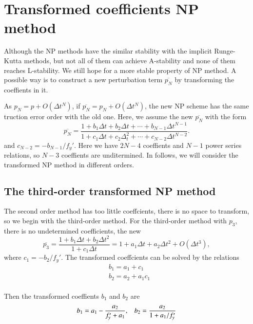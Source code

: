 \documentclass[review]{elsarticle}
\theoremstyle{plain}\newtheorem{definition}{\sc{Definition}}
\theoremstyle{defination}\newtheorem{example}{Example}[section]
\numberwithin{equation}{section}
\numberwithin{table}{section}
\begin{document}
{\section{Transformed coefficients NP method} \label{chap:tran} 
Although the NP methods have  the similar stability with the implicit Runge-Kutta methods, but  not all of them can  achieve  A-stability and none of them reaches L-stability. We still hope for a more stable property of NP method.     
A possible way is  to construct a new perturbation term $\overline{p_N}$ by transforming  the coeffients in it.

As $p_N = p + O(\Delta t^{N})$, if $\overline{p_N}= p_N + O(\Delta t^{N})$, the new NP scheme has the same truction error order with the old one. Here, we  assume the new $\overline{p_N}$ with the form
\begin{equation}
  \overline{p_N} = \frac{ 1+ b_1 \Delta t+  b_2\Delta t +\cdots +b_{N-1}\Delta t^{N-1}}{1+c_1\Delta t +c_2\Delta_t^2 +\cdots+ c_{N-2}\Delta t^{N-2}}.
  \end{equation}
and 
  $c_{N-2}=-b_{N-1}/f_y'$.
  Here we have $2N-4$ coeffients and $N-1$ power series relations, so $N-3$ coeffients are  unditermined. In follows, we will consider the transformed  NP method in different orders.    

  \subsection{ The third-order transformed NP method}
The second order method has too little coeffcients, there is no space to  transform, so we begin with the third-order method. For the third-order method with $p_3$, there is no undetermined coefficients,  the new 
\begin{equation}
\overline{p_3} =
\frac{ 1+ b_1 \Delta t+ b_2\Delta t^2}{1+c_1 \Delta t} = 1+a_1\Delta t +a_2 \Delta t^2 + O(\Delta t^3),
\end{equation}
where $c_1=-b_2 /f_y'$. The transformed coeffcients can be solved by the relations
\begin{equation}
  \begin{aligned}
	&b_1=a_1+c_1\\
	&b_2=a_2+a_1c_1\\
	\end{aligned}
\end{equation}

Then the transformed coeffients $b_1$ and $b_2$ are  
\begin{equation}
  b_1= a_1- \frac{a_2}{f_y'+a_1},\hspace{0.3cm}  b_2=\frac{a_2}{1+a_1/f_y'}
\end{equation}

}
\end{document}
